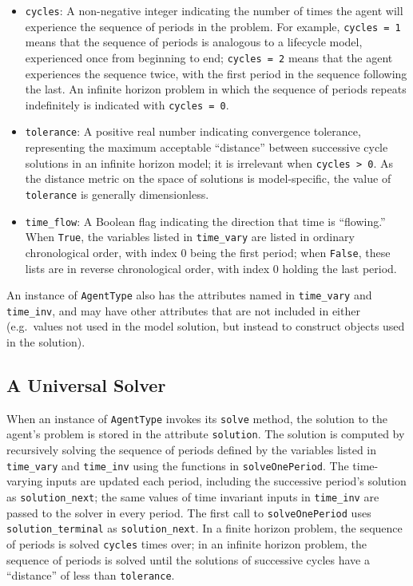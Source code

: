 \documentclass[12pt,titlepage,letterpaper]{econtex}
\begin{document}
\begin{itemize}
\item \texttt{cycles}: A non-negative integer indicating the number of times the agent will experience the sequence of periods in the problem.  For example, \texttt{cycles = 1} means that the sequence of periods is analogous to a lifecycle model, experienced once from beginning to end; \texttt{cycles = 2} means that the agent experiences the sequence twice, with the first period in the sequence following the last.  An infinite horizon problem in which the sequence of periods repeats indefinitely is indicated with \texttt{cycles = 0}.

\item \texttt{tolerance}: A positive real number indicating convergence tolerance, representing the maximum acceptable ``distance'' between successive cycle solutions in an infinite horizon model; it is irrelevant when \texttt{cycles > 0}.  As the distance metric on the space of solutions is model-specific, the value of \texttt{tolerance} is generally dimensionless.

\item \texttt{time\_flow}: A Boolean flag indicating the direction that time is ``flowing.''  When \texttt{True}, the variables listed in \texttt{time\_vary} are listed in ordinary chronological order, with index 0 being the first period; when \texttt{False}, these lists are in reverse chronological order, with index 0 holding the last period.
\end{itemize}

An instance of \texttt{AgentType} also has the attributes named in \texttt{time\_vary} and \texttt{time\_inv}, and may have other attributes that are not included in either (e.g.\  values not used in the model solution, but instead to construct objects used in the solution).

\subsection{A Universal Solver}\label{sec:UniversalSolver}

When an instance of \texttt{AgentType} invokes its \texttt{solve} method, the solution to the agent's problem is stored in the attribute \texttt{solution}.  The solution is computed by recursively solving the sequence of periods defined by the variables listed in \texttt{time\_vary} and \texttt{time\_inv} using the functions in \texttt{solveOnePeriod}.  The time-varying inputs are updated each period, including the successive period's solution as \texttt{solution\_next}; the same values of time invariant inputs in \texttt{time\_inv} are passed to the solver in every period.  The first call to \texttt{solveOnePeriod} uses \texttt{solution\_terminal} as \texttt{solution\_next}.  In a finite horizon problem, the sequence of periods is solved \texttt{cycles} times over; in an infinite horizon problem, the sequence of periods is solved until the solutions of successive cycles have a ``distance'' of less than \texttt{tolerance}.
\end{document}
